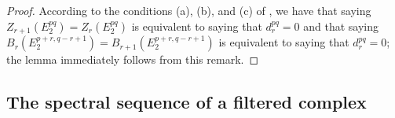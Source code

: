 \begin{proof}
\label{proof-0.11.1.10}
According to the conditions (a), (b), and (c) of , we have that saying $Z_{r+1}(E_2^{pq})=Z_r(E_2^{pq})$ is equivalent to saying that $d_r^{pq}=0$ and that saying $B_r(E_2^{p+r,q-r+1})=B_{r+1}(E_2^{p+r,q-r+1})$ is equivalent to saying that $d_r^{pq}=0$; the lemma immediately follows from this remark.
\end{proof}

\subsection{The spectral sequence of a filtered complex}
\label{subsection-the-spectral-sequence-of-a-filtered-complex}

